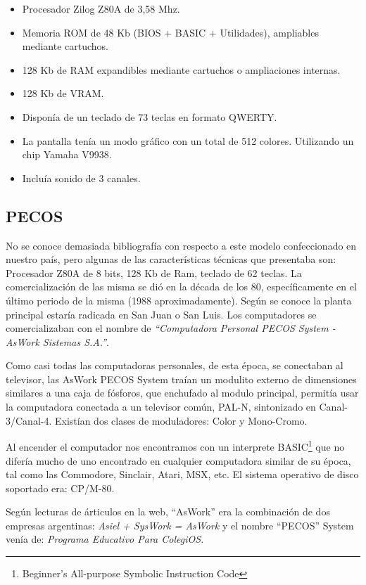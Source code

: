 \documentclass[%
 	final,
%
	notitlepage,
	narroweqnarray,
	inline,
 	twoside,
	]{ieee}
\begin{document}
\begin{itemize}
\item Procesador Zilog Z80A de 3,58 Mhz.
\item Memoria ROM de 48 Kb (BIOS + BASIC + Utilidades), ampliables mediante cartuchos.
\item 128 Kb de RAM expandibles mediante cartuchos o ampliaciones internas.
\item 128 Kb de VRAM.
\item Dispon\'ia de un teclado de 73 teclas en formato QWERTY.
\item La pantalla ten\'ia un modo gr\'afico con un total de 512 colores. Utilizando un chip Yamaha V9938.
\item Inclu\'ia sonido de 3 canales.
\end{itemize}

\subsection*{PECOS}

No se conoce demasiada bibliograf\'ia con respecto a este modelo confeccionado en nuestro pa\'is, pero algunas de las  caracter\'isticas t\'ecnicas que presentaba son: Procesador Z80A  de 8 bits, 128 Kb de Ram, teclado de 62 teclas. La comercializaci\'on de las misma se di\'o en la d\'ecada de los 80, espec\'ificamente en el \'ultimo periodo de la misma (1988 aproximadamente). Seg\'un se conoce la planta principal estar\'ia radicada en San Juan o San Luis. Los computadores se comercializaban con el nombre de \textit{``Computadora Personal PECOS System - AsWork Sistemas S.A.''}.

Como casi todas las computadoras personales, de esta \'epoca, se conectaban al televisor, las AsWork PECOS System tra\'ian un modulito externo de dimensiones similares a una caja de f\'osforos, que enchufado al modulo principal, permit\'ia usar la computadora conectada a un televisor com\'un, PAL-N, sintonizado en Canal-3/Canal-4. Exist\'ian dos clases de moduladores: Color y Mono-Cromo. 

Al encender el computador nos encontramos con un interprete BASIC\footnote{Beginner's All-purpose Symbolic Instruction Code} que no difer\'ia mucho de uno encontrado en cualquier computadora similar de su \'epoca, tal como las Commodore, Sinclair, Atari, MSX, etc. El sistema operativo de disco soportado era: CP/M-80.

Seg\'un lecturas de \'articulos en la web\cite{pecos}, ``AsWork'' era la combinaci\'on de dos empresas argentinas: \textit{Asiel + SysWork = AsWork} y el nombre ``PECOS'' System ven\'ia de: \textit{Programa Educativo Para ColegiOS.}
\end{document}
